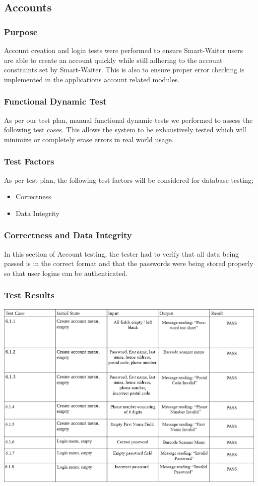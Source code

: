 \documentclass[12pt, titlepage]{article}
\begin{document}
\subsection{Accounts}
\subsubsection{Purpose}
Account creation and login tests were performed to ensure Smart-Waiter users are able to create an account quickly while still adhering to the account constraints set by Smart-Waiter. This is also to ensure proper error checking is implemented in the applications account related modules.
\subsubsection{Functional Dynamic Test}
As per our test plan, manual functional dynamic tests we performed to assess the following test cases. This allows the system to be exhaustively tested which will minimize or completely erase errors in real world usage.
\subsubsection{Test Factors}
As per test plan, the following test factors will be considered for database testing;
\begin{itemize}
 \item Correctness
 \item Data Integrity
 \end{itemize}
\subsubsection{Correctness and Data Integrity}
In this section of Account testing, the tester had to verify that all data being passed is in the correct format and that the passwords were being stored properly so that user logins can be authenticated. 

\subsubsection{Test Results}
\includegraphics[width=1.2\textwidth]{accountTC.png}
\end{document}
